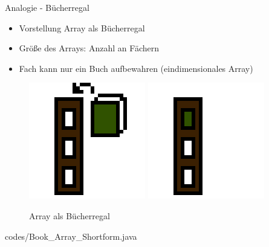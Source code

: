 \documentclass{../tuda-beamer}
\begin{document}
  \begin{frame}{Analogie - Bücherregal}
    \begin{itemize}
      \item Vorstellung Array als Bücherregal
      \item Größe des Arrays: Anzahl an Fächern
      \item Fach kann nur ein Buch aufbewahren (eindimensionales Array)
    \end{itemize}
    \begin{figure}[h]
      \centering
      \includegraphics[width=.2\linewidth]{graphics/lib_1_1.png}
      \includegraphics[width=.2\linewidth]{graphics/lib_1_2.png}
      \caption{Array als Bücherregal}
    \end{figure}
  \end{frame}

  \begin{frame}[c]
    \begin{figure}[h]
      \centering
      
    \end{figure}
  \end{frame}

  \begin{frame}[c]
    
  \end{frame}

  \begin{frame}
    
    {codes/Book_Array_Shortform.java}
  \end{frame}
\end{document}
